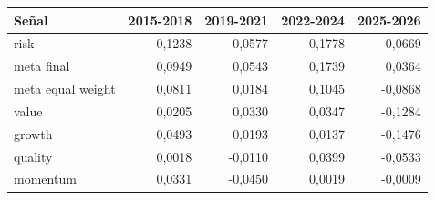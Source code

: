 \begin{tabular}{lrrrr}
\toprule
Señal & 2015-2018 & 2019-2021 & 2022-2024 & 2025-2026 \\
\midrule
risk & 0,1238 & 0,0577 & 0,1778 & 0,0669 \\
meta final & 0,0949 & 0,0543 & 0,1739 & 0,0364 \\
meta equal weight & 0,0811 & 0,0184 & 0,1045 & -0,0868 \\
value & 0,0205 & 0,0330 & 0,0347 & -0,1284 \\
growth & 0,0493 & 0,0193 & 0,0137 & -0,1476 \\
quality & 0,0018 & -0,0110 & 0,0399 & -0,0533 \\
momentum & 0,0331 & -0,0450 & 0,0019 & -0,0009 \\
\bottomrule
\end{tabular}
